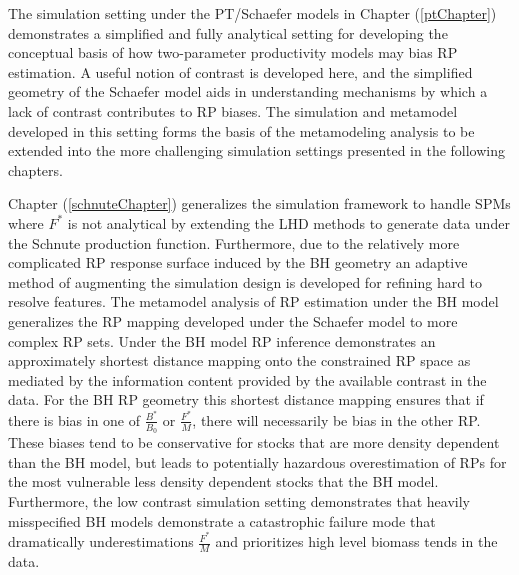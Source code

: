 \documentclass[12pt]{ucscthesis}
\begin{document}
%
The simulation setting under the PT/Schaefer models in Chapter (\ref{ptChapter}) 
demonstrates a simplified and fully analytical setting for developing the 
conceptual basis of how two-parameter productivity models may bias RP estimation. 
A useful notion of contrast is developed here, and the simplified geometry of the 
Schaefer model aids in understanding mechanisms by which a lack of contrast 
contributes to RP biases.
The simulation and metamodel developed in this setting forms the basis of the 
metamodeling analysis to be extended into the more challenging simulation settings 
presented in the following chapters.


%
Chapter (\ref{schnuteChapter}) generalizes the simulation framework to handle 
SPMs where $F^*$ is not analytical by extending the LHD methods to generate data 
under the Schnute production function. Furthermore, due to the relatively more 
complicated RP response surface induced by the BH geometry an adaptive method of 
augmenting the simulation design is developed for refining hard to resolve features. 
The metamodel analysis of RP estimation under the BH model generalizes the RP 
mapping developed under the Schaefer model to more complex RP sets. Under the 
BH model RP inference demonstrates  an approximately shortest distance mapping 
onto the constrained RP space as mediated by the information content provided 
by the available contrast in the data. For the BH RP geometry this shortest 
distance mapping ensures that if there is bias in one of $\frac{B^*}{B_0}$ or 
$\frac{F^*}{M}$, there will necessarily be bias in the other RP. These biases 
tend to be conservative for stocks that are more density dependent than the 
BH model, but leads to potentially hazardous overestimation of RPs for the most 
vulnerable less density dependent stocks that the BH model. Furthermore, the low 
contrast simulation setting demonstrates that heavily misspecified BH models 
demonstrate a catastrophic failure mode that dramatically underestimations $\frac{F^*}{M}$ and 
prioritizes high level biomass tends in the data. 
\end{document}
